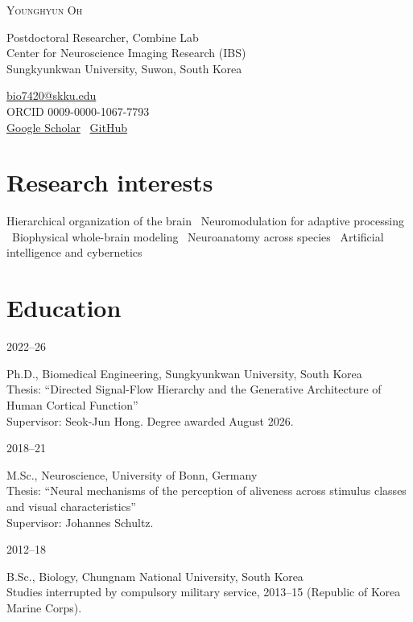 \documentclass[11pt]{article}
\newcommand{\dated}[2]{%
  \begin{minipage}[t]{0.10\textwidth}\small #1\end{minipage}%
  \begin{minipage}[t]{0.89\textwidth}#2\end{minipage}\par\smallskip}
\begin{document}
\begin{center}
  {\fontsize{22}{26}\selectfont\scshape Younghyun Oh}
\end{center}
\vspace{2pt}

\begin{minipage}[t]{0.60\textwidth}
  \raggedright\small
  Postdoctoral Researcher, Combine Lab\\
  Center for Neuroscience Imaging Research (IBS)\\
  Sungkyunkwan University, Suwon, South Korea
\end{minipage}\hfill
\begin{minipage}[t]{0.38\textwidth}
  \raggedleft\small
  \href{mailto:bio7420@skku.edu}{bio7420@skku.edu}\\
  ORCID 0009-0000-1067-7793\\
  \href{https://scholar.google.com/citations?user=I0_2hEUAAAAJ}{Google Scholar} \textperiodcentered\ \href{https://github.com/youngwisely}{GitHub}
\end{minipage}

\section{Research interests}
Hierarchical organization of the brain \textperiodcentered\ Neuromodulation for adaptive processing
\textperiodcentered\ Biophysical whole-brain modeling \textperiodcentered\ Neuroanatomy across species
\textperiodcentered\ Artificial intelligence and cybernetics

\section{Education}
\dated{2022--26}{Ph.D., Biomedical Engineering, Sungkyunkwan University, South Korea\\
Thesis: ``Directed Signal-Flow Hierarchy and the Generative Architecture of Human Cortical Function''\\
Supervisor: Seok-Jun Hong. Degree awarded August 2026.}
\dated{2018--21}{M.Sc., Neuroscience, University of Bonn, Germany\\
Thesis: ``Neural mechanisms of the perception of aliveness across stimulus classes and visual characteristics''\\
Supervisor: Johannes Schultz.}
\dated{2012--18}{B.Sc., Biology, Chungnam National University, South Korea\\
Studies interrupted by compulsory military service, 2013--15 (Republic of Korea Marine Corps).}
\end{document}
